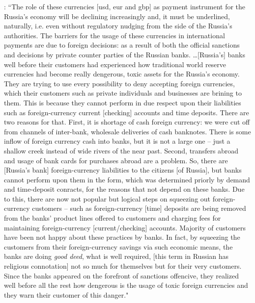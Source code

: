 \citep[emphasis added]{tulin2022}: ``The role of these currencies [\ac{usd}, \ac{eur} and \ac{gbp}] as payment instrument for the Russia's economy will be declining increasingly and, it must be underlined, naturally, i.e. even without regulatory nudging from the side of the Russia's authorities. The barriers for the usage of these currencies in international payments are due to foreign decisions: as a result of both the official sanctions and decisions by private counter parties of the Russian banks. \dots [Russia's] banks well before their customers had experienced how traditional world reserve currencies had become really dengerous, toxic assets for the Russia's economy. They are trying to use every possibility to deny accepting foreign currencies, which their customers such as private individuals and businesses are brining to them. This is because they cannot perform in due respect upon their liabilities such as foreign-currency current [checking] accounts and time deposits. There are two reasons for that. First, it is shortage of cash foreign currency: we were cut off from channels of inter-bank, wholesale deliveries of cash banknotes. There is some inflow of foreign currency cash into banks, but it is not a large one -- just a shallow creek instead of wide rivers of the near past. Second, transfers abroad and usage of bank cards for purchases abroad are a problem. So, there are [Russia's bank] foreign-currency liabilities to the citizens [of Russia], but banks cannot perform upon them in the form, which was determined priorly by demand and time-deposit conracts, for the reasons that not depend on these banks. Due to this, there are now not popular but logical steps on squeezing out foreign-currency customers -- such as foreign-currency [time] deposits are being removed from the banks' product lines offered to customers and charging fees for maintaining foreign-currency [current/checking] accounts. Majority of customers have been not happy about these practices by banks. In fact, by squeezing the customers from their foreign-currency savings via such economic means, the banks are doing \textit{good deed}, what is well required, [this term in Russian has religious connotation] not so much for themselves but for their very customers. Since the banks appeared on the forefront of sanctions offencive, they realized well before all the rest how dengerous is the usage of toxic foreign currencies and they warn their customer of this danger."